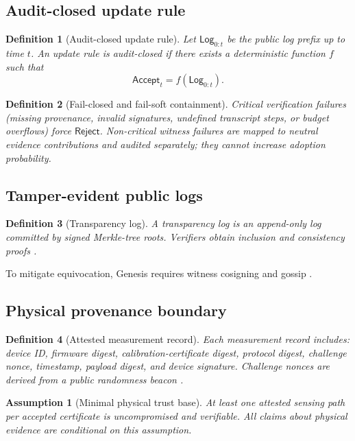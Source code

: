 \documentclass[11pt,a4paper]{article}
\newtheorem{definition}{Definition}[section]
\newtheorem{assumption}{Assumption}[section]
\newcommand{\Log}{\mathsf{Log}}
\newcommand{\Acc}{\mathsf{Accept}}
\newcommand{\Rej}{\mathsf{Reject}}
\begin{document}
\subsection{Audit-closed update rule}
\begin{definition}[Audit-closed update rule]
Let $\Log_{0:t}$ be the public log prefix up to time $t$.
An update rule is \emph{audit-closed} if there exists a deterministic function $f$ such that
\[
\Acc_t=f(\Log_{0:t}).
\]
\end{definition}

\begin{definition}[Fail-closed and fail-soft containment]
Critical verification failures (missing provenance, invalid signatures, undefined transcript steps, or budget overflows) force $\Rej$.
Non-critical witness failures are mapped to neutral evidence contributions and audited separately; they cannot increase adoption probability.
\end{definition}

\subsection{Tamper-evident public logs}
\begin{definition}[Transparency log]
A transparency log is an append-only log committed by signed Merkle-tree roots.
Verifiers obtain inclusion and consistency proofs \citep{RFC6962}.
\end{definition}

To mitigate equivocation, Genesis requires witness cosigning and gossip \citep{Chuat2015Gossip,Oxford2020CTGossip}.

\subsection{Physical provenance boundary}
\begin{definition}[Attested measurement record]
Each measurement record includes:
device ID, firmware digest, calibration-certificate digest, protocol digest, challenge nonce, timestamp, payload digest, and device signature.
Challenge nonces are derived from a public randomness beacon \citep{NISTIR8213draft,NISTBeaconProject}.
\end{definition}

\begin{assumption}[Minimal physical trust base]
At least one attested sensing path per accepted certificate is uncompromised and verifiable.
All claims about physical evidence are conditional on this assumption.
\end{assumption}
\end{document}
